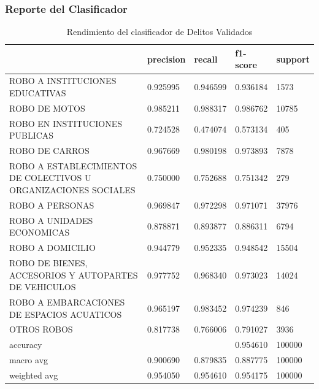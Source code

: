 \documentclass[onecolumn, journal, english, 12pt, a4paper]{IEEEtran} %
\theoremstyle{definition}
\begin{document}
\subsubsection{Reporte del Clasificador}
\begin{table}[htbp]
    \caption{Rendimiento del clasificador de Delitos Validados}
    \label{tab:reporteClasificacionModeloDelitosValidados}
    \centering
    \scriptsize
    \begin{tabularx}{\textwidth}{p{}XXXX}
        \toprule
         & precision & recall & f1-score & support \\
        \midrule
        ROBO A INSTITUCIONES EDUCATIVAS & 0.925995 & 0.946599 & 0.936184 & 1573 \\
        ROBO DE MOTOS & 0.985211 & 0.988317 & 0.986762 & 10785 \\
        ROBO EN INSTITUCIONES PUBLICAS & 0.724528 & 0.474074 & 0.573134 & 405 \\
        ROBO DE CARROS & 0.967669 & 0.980198 & 0.973893 & 7878 \\
        ROBO A ESTABLECIMIENTOS DE COLECTIVOS U ORGANIZACIONES SOCIALES & 0.750000 & 0.752688 & 0.751342 & 279 \\
        ROBO A PERSONAS & 0.969847 & 0.972298 & 0.971071 & 37976 \\
        ROBO A UNIDADES ECONOMICAS & 0.878871 & 0.893877 & 0.886311 & 6794 \\
        ROBO A DOMICILIO & 0.944779 & 0.952335 & 0.948542 & 15504 \\
        ROBO DE BIENES, ACCESORIOS Y AUTOPARTES DE VEHICULOS & 0.977752 & 0.968340 & 0.973023 & 14024 \\
        ROBO A EMBARCACIONES DE ESPACIOS ACUATICOS & 0.965197 & 0.983452 & 0.974239 & 846\\
        OTROS ROBOS & 0.817738 & 0.766006 & 0.791027 & 3936 \\ \hline
        accuracy & {} & {} & 0.954610 & 100000 \\
        macro avg & 0.900690 & 0.879835 & 0.887775 & 100000 \\
        weighted avg & 0.954050 & 0.954610 & 0.954175 & 100000 \\
        \bottomrule
    \end{tabularx}
    
\end{table}
\end{document}
